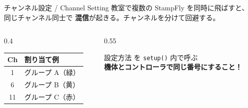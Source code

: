 \begin{frame}{チャンネル設定 / Channel Setting}
  教室で複数の StampFly を同時に飛ばすと、同じチャンネル同士で
  \textbf{混信}が起きる。チャンネルを分けて回避する。

  \vspace{0.5em}

  \begin{columns}[c]
    \begin{column}{0.4\textwidth}
      \centering
      \begin{tabular}{cl}
        \hline
        \textbf{Ch} & \textbf{割り当て例} \\
        \hline
        1  & \textcolor{green!70!black}{グループ A（緑）} \\
        6  & \textcolor{yellow!80!black}{グループ B（黄）} \\
        11 & \textcolor{red!80!black}{グループ C（赤）} \\
        \hline
      \end{tabular}
    \end{column}
    \begin{column}{0.55\textwidth}
      \begin{alertblock}{設定方法}
         を \texttt{setup()} 内で呼ぶ\\
        \textbf{機体とコントローラで同じ番号にすること！}
      \end{alertblock}
    \end{column}
  \end{columns}
\end{frame}

